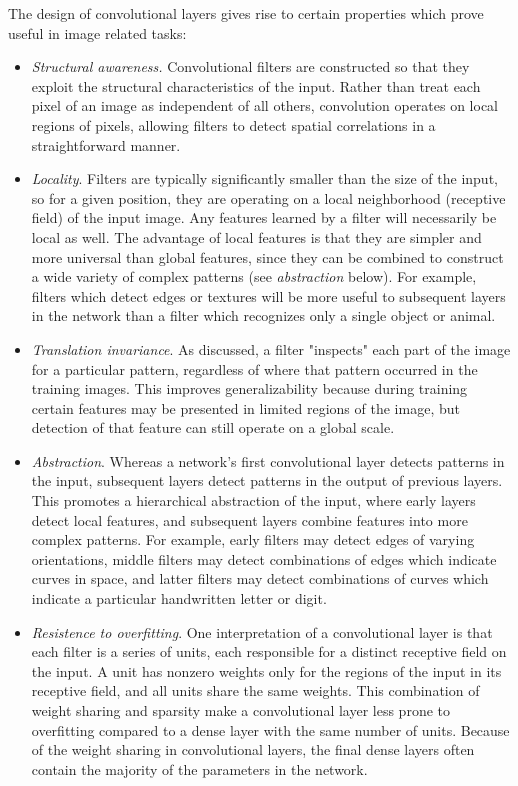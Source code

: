 The design of convolutional layers gives rise to certain properties which prove useful in image related tasks:
\begin{itemize}
	\item \textit{Structural awareness.}
	Convolutional filters are constructed so that they exploit the structural characteristics of the input.
 	Rather than treat each pixel of an image as independent of all others, convolution operates on local regions of pixels, allowing filters to detect spatial correlations in a straightforward manner.
	\item \textit{Locality}. 
	Filters are typically significantly smaller than the size of the input, so for a given position, they are operating on a local neighborhood (receptive field) of the input image. 
	Any features learned by a filter will necessarily be local as well. 
 	The advantage of local features is that they are simpler and more universal than global features, since they can be combined to construct a wide variety of complex patterns (see \textit{abstraction} below).
	For example, filters which detect edges or textures will be more useful to subsequent layers in the network than a filter which recognizes only a single object or animal.
 	\item \textit{Translation invariance}. 
 	As discussed, a filter "inspects" each part of the image for a particular pattern, regardless of where that pattern occurred in the training images.
 	This improves generalizability because during training certain features may be presented in limited regions of the image, but detection of that feature can still operate on a global scale.
 	\item \textit{Abstraction}. Whereas a network's first convolutional layer detects patterns in the input, subsequent layers detect patterns in the output of previous layers. 
 	This promotes a hierarchical abstraction of the input, where early layers detect local features, and subsequent layers combine features into more complex patterns.
 	For example, early filters may detect edges of varying orientations, middle filters may detect combinations of edges which indicate curves in space, and latter filters may detect combinations of curves which indicate a particular handwritten letter or digit.
 	\item \textit{Resistence to overfitting}.
 	One interpretation of a convolutional layer is that each filter is a series of units, each responsible for a distinct receptive field on the input.
 	A unit has nonzero weights only for the regions of the input in its receptive field, and all units share the same weights. 
 	This combination of weight sharing and sparsity make a convolutional layer less prone to overfitting compared to a dense layer with the same number of units.
 	Because of the weight sharing in convolutional layers, the final dense layers often contain the majority of the parameters in the network.
\end{itemize}

